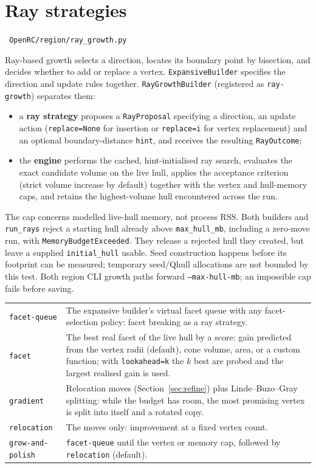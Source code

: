 \documentclass[11pt,a4paper]{report}
\newcommand{\code}[1]{\texttt{\small #1}}
\newcommand{\file}[1]{\texttt{\small\color{nbgrey} #1}}
\begin{document}
\section{Ray strategies}
\label{sec:rays}

\file{OpenRC/region/ray\_growth.py}

Ray-based growth selects a direction, locates its boundary point by bisection,
and decides whether to add or replace a vertex. \code{ExpansiveBuilder}
specifies the direction and update rules together.
\code{RayGrowthBuilder} (registered as \code{ray-growth}) separates them:

\begin{itemize}
\item a \textbf{ray strategy} proposes a \code{RayProposal} specifying a
  direction, an update action (\code{replace=None} for insertion or
  \code{replace=i} for vertex replacement) and an optional boundary-distance
  \code{hint}, and receives the resulting \code{RayOutcome};
\item the \textbf{engine} performs the cached, hint-initialised ray search,
  evaluates the exact candidate volume on the live hull, applies the acceptance
  criterion (strict volume increase by default) together with the vertex and
  hull-memory caps, and retains the highest-volume hull encountered across the
  run.
\end{itemize}

The cap concerns modelled live-hull memory, not process RSS. Both builders and
\code{run\_rays} reject a starting hull already above \code{max\_hull\_mb},
including a zero-move run, with \code{MemoryBudgetExceeded}. They release a
rejected hull they created, but leave a supplied \code{initial\_hull} usable.
Seed construction happens before its footprint can be measured; temporary
seed/Qhull allocations are not bounded by this test. Both region CLI growth
paths forward \code{--max-hull-mb}; an impossible cap fails before saving.

\begin{center}\small
\begin{tabular}{@{}l>{\raggedright\arraybackslash}p{10.6cm}@{}}
\toprule
\code{facet-queue} & The expansive builder's virtual facet queue with any
  facet-selection policy: facet breaking as a ray strategy. \\
\code{facet} & The best real facet of the live hull by a score: gain predicted
  from the vertex radii (default), cone volume, area, or a custom function; with
  \code{lookahead=k} the $k$ best are probed and the largest realised gain is used. \\
\code{gradient} & Relocation moves (Section~\ref{sec:refine}) plus
  Linde--Buzo--Gray splitting: while the budget has room, the most promising
  vertex is split into itself and a rotated copy. \\
\code{relocation} & The moves only: improvement at a fixed vertex count. \\
\code{grow-and-polish} & \code{facet-queue} until the vertex or memory cap,
  followed by \code{relocation} (default). \\
\bottomrule
\end{tabular}
\end{center}
\end{document}
